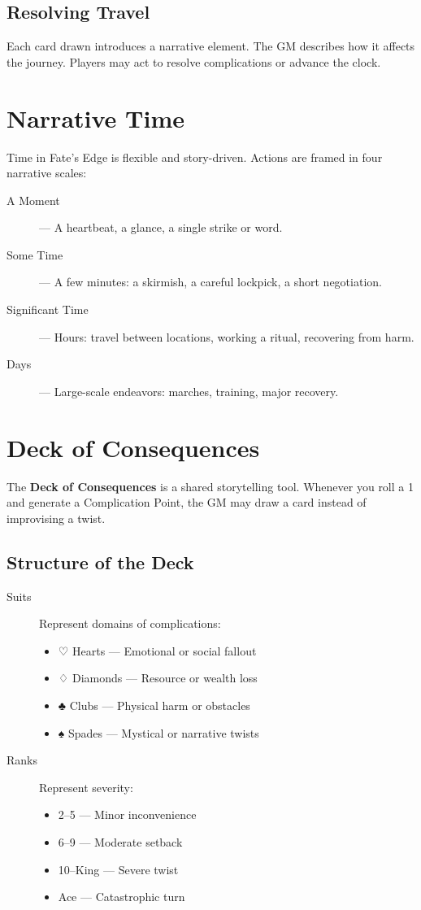 \subsection*{Resolving Travel}

Each card drawn introduces a narrative element. The GM describes how it affects the journey. Players may act to resolve complications or advance the clock.

\section{Narrative Time}

Time in Fate’s Edge is flexible and story-driven. Actions are framed in four narrative scales:

\begin{description}
  \item[A Moment] — A heartbeat, a glance, a single strike or word.
  \item[Some Time] — A few minutes: a skirmish, a careful lockpick, a short negotiation.
  \item[Significant Time] — Hours: travel between locations, working a ritual, recovering from harm.
  \item[Days] — Large-scale endeavors: marches, training, major recovery.
\end{description}

\section{Deck of Consequences}

The \textbf{Deck of Consequences} is a shared storytelling tool. Whenever you roll a 1 and generate a Complication Point, the GM may draw a card instead of improvising a twist.

\subsection*{Structure of the Deck}

\begin{description}
  \item[Suits] Represent domains of complications:
    \begin{itemize}
      \item ♡ Hearts — Emotional or social fallout
      \item ♢ Diamonds — Resource or wealth loss
      \item ♣ Clubs — Physical harm or obstacles
      \item ♠ Spades — Mystical or narrative twists
    \end{itemize}
  \item[Ranks] Represent severity:
    \begin{itemize}
      \item 2–5 — Minor inconvenience
      \item 6–9 — Moderate setback
      \item 10–King — Severe twist
      \item Ace — Catastrophic turn
    \end{itemize}
\end{description}

